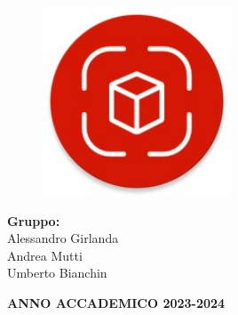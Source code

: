 \begin{titlepage}
\begin{center}
            \LARGE
            \textbf{\@title}

            \begin{figure}[ht]
                \centering
                \includegraphics[width=0.5\textwidth]{Immagini/App/icona_app.jpg}
            \end{figure}
    
            \large
            \begin{flushright}
                \textbf{Gruppo:} \\ Alessandro Girlanda \\  Andrea Mutti \\  Umberto Bianchin \\
            \end{flushright}
    
            \textbf{ANNO ACCADEMICO 2023-2024}
        
            \makeatother %
        \end{center}
    \restoregeometry
\end{titlepage}
